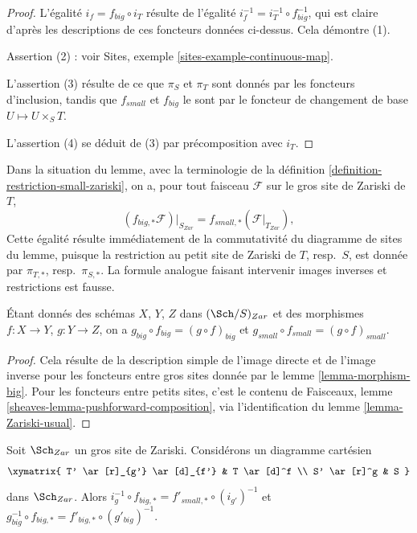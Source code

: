 \begin{proof}
L'égalité $i_f = f_{big} \circ i_T$ résulte de
l'égalité $i_f^{-1} = i_T^{-1} \circ f_{big}^{-1}$, qui est
claire d'après les descriptions de ces foncteurs données ci-dessus.
Cela démontre (1).

\medskip\noindent
Assertion (2) : voir Sites, exemple \ref{sites-example-continuous-map}.

\medskip\noindent
L'assertion (3) résulte de ce que $\pi_S$ et $\pi_T$ sont donnés par
les foncteurs d'inclusion, tandis que $f_{small}$ et $f_{big}$ le sont par le
foncteur de changement de base $U \mapsto U \times_S T$.

\medskip\noindent
L'assertion (4) se déduit de (3) par précomposition avec $i_T$.
\end{proof}

\noindent
Dans la situation du lemme, avec la terminologie de la
définition \ref{definition-restriction-small-zariski},
on a, pour tout faisceau $\mathcal{F}$ sur le gros site de Zariski de $T$,
$$
(f_{big, *}\mathcal{F})|_{S_{Zar}} =
f_{small, *}(\mathcal{F}|_{T_{Zar}}),
$$
Cette égalité résulte immédiatement de la commutativité du diagramme de
sites du lemme, puisque la restriction au petit site de Zariski de
$T$, resp.\ $S$, est donnée par $\pi_{T, *}$, resp.\ $\pi_{S, *}$. La formule
analogue faisant intervenir images inverses et restrictions est fausse.

\begin{lemma}
\label{lemma-composition}
Étant donnés des schémas $X$, $Y$, $Z$ dans $(\Sch/S)_{Zar}$
et des morphismes $f : X \to Y$, $g : Y \to Z$, on a
$g_{big} \circ f_{big} = (g \circ f)_{big}$ et
$g_{small} \circ f_{small} = (g \circ f)_{small}$.
\end{lemma}

\begin{proof}
Cela résulte de la description simple de l'image directe
et de l'image inverse pour les foncteurs entre gros sites donnée par le
lemme \ref{lemma-morphism-big}. Pour les foncteurs
entre petits sites, c'est le contenu de
Faisceaux, lemme \ref{sheaves-lemma-pushforward-composition},
via l'identification du lemme \ref{lemma-Zariski-usual}.
\end{proof}

\begin{lemma}
\label{lemma-morphism-big-small-cartesian-diagram}
Soit $\Sch_{Zar}$ un gros site de Zariski. Considérons un diagramme cartésien
$$
\xymatrix{
T' \ar[r]_{g'} \ar[d]_{f'} & T \ar[d]^f \\
S' \ar[r]^g & S
}
$$
dans $\Sch_{Zar}$. Alors
$i_g^{-1} \circ f_{big, *} = f'_{small, *} \circ (i_{g'})^{-1}$
et $g_{big}^{-1} \circ f_{big, *} = f'_{big, *} \circ (g'_{big})^{-1}$.
\end{lemma}

